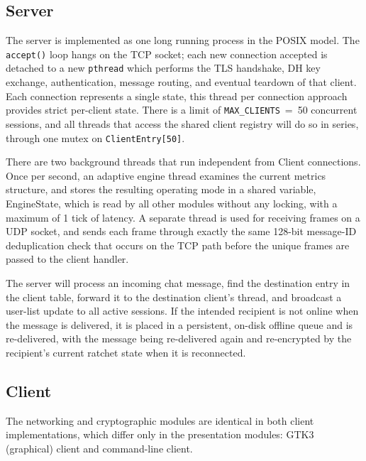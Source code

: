 \documentclass[conference]{IEEEtran}
\begin{document}
\subsection{Server}

The server is implemented as one long running process in the POSIX model. The \texttt{accept()} loop hangs on the TCP socket; each new connection accepted is detached to a new \texttt{pthread} which performs the TLS handshake, DH key exchange, authentication, message routing, and eventual teardown of that client. Each connection represents a single state, this thread per connection approach provides strict per-client state. There is a limit of \texttt{MAX\_CLIENTS}~=~50 concurrent sessions, and all threads that access the shared client registry will do so in series, through one mutex on \texttt{ClientEntry[50]}.

There are two background threads that run independent from Client connections. Once per second, an adaptive engine thread examines the current metrics structure, and stores the resulting operating mode in a shared variable, EngineState, which is read by all other modules without any locking, with a maximum of 1 tick of latency. A separate thread is used for receiving frames on a UDP socket, and sends each frame through exactly the same 128-bit message-ID deduplication check that occurs on the TCP path before the unique frames are passed to the client handler.

The server will process an incoming chat message, find the destination entry in the client table, forward it to the destination client's thread, and broadcast a user-list update to all active sessions. If the intended recipient is not online when the message is delivered, it is placed in a persistent, on-disk offline queue and is re-delivered, with the message being re-delivered again and re-encrypted by the recipient's current ratchet state when it is reconnected.

\subsection{Client}

The networking and cryptographic modules are identical in both client implementations, which differ only in the presentation modules: GTK3 (graphical) client and command-line client.
\end{document}
